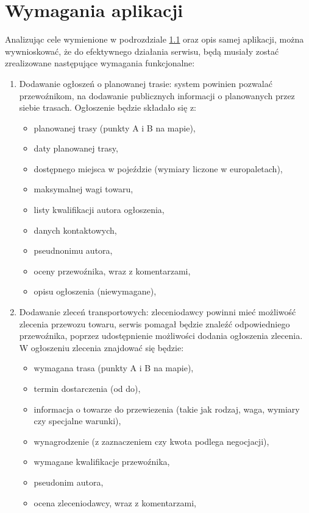 \section{Wymagania aplikacji}
Analizując cele wymienione w podrozdziale \hyperref[sec:cele]{1.1} oraz opis samej aplikacji, można wywnioskować, że do efektywnego działania serwisu, będą musiały zostać zrealizowane następujące wymagania funkcjonalne:
\begin{enumerate}
    \item Dodawanie ogłoszeń o planowanej trasie: system powinien pozwalać przewoźnikom, na dodawanie publicznych informacji o planowanych przez siebie trasach. Ogłoszenie będzie składało się z:
    \begin{itemize}
        \item planowanej trasy (punkty A i B na mapie),
        \item daty planowanej trasy,
        \item dostępnego miejsca w pojeździe (wymiary liczone w europaletach),
        \item maksymalnej wagi towaru,
        \item listy kwalifikacji autora ogłoszenia,
        \item danych kontaktowych,
        \item pseudnonimu autora,
        \item oceny przewoźnika, wraz z komentarzami,
        \item opisu ogłoszenia (niewymagane),
    \end{itemize}
    \item Dodawanie zleceń transportowych: zleceniodawcy powinni mieć możliwość zlecenia przewozu towaru, serwis pomagał będzie znaleźć odpowiedniego przewoźnika, poprzez udostępnienie możliwości dodania ogłoszenia zlecenia. W ogłoszeniu zlecenia znajdować się będzie:
    \begin{itemize}
        \item wymagana trasa (punkty A i B na mapie),
        \item termin dostarczenia (od do),
        \item informacja o towarze do przewiezenia (takie jak rodzaj, waga, wymiary czy specjalne warunki),
        \item wynagrodzenie (z zaznaczeniem czy kwota podlega negocjacji),
        \item wymagane kwalifikacje przewoźnika,
        \item pseudonim autora,
        \item ocena zleceniodawcy, wraz z komentarzami,

\end{itemize}
\end{enumerate}
